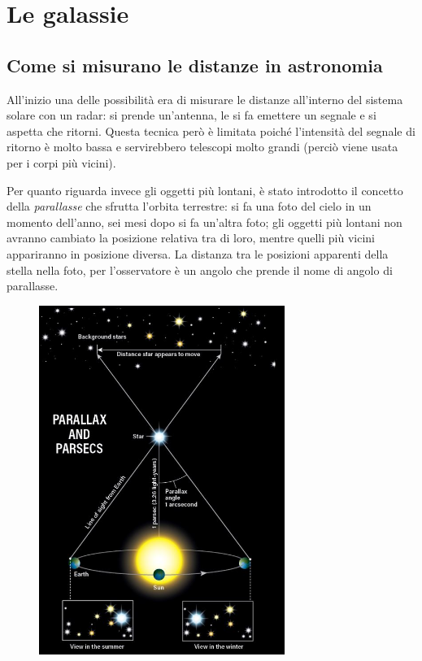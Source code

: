 \newpage

\section{Le galassie}

\subsection{Come si misurano le distanze in astronomia}
All'inizio una delle possibilità era di misurare le distanze all'interno del sistema solare con un radar: si prende un'antenna, le si fa emettere un segnale e si aspetta che ritorni. Questa tecnica però è limitata poiché l'intensità del segnale di ritorno è molto bassa e servirebbero telescopi molto grandi (perciò viene usata per i corpi più vicini).

Per quanto riguarda invece gli oggetti più lontani, è stato introdotto il concetto della \textit{parallasse} che sfrutta l'orbita terrestre: si fa una foto del cielo in un momento dell'anno, sei mesi dopo si fa un'altra foto; gli oggetti più lontani non avranno cambiato la posizione relativa tra di loro, mentre quelli più vicini appariranno in posizione diversa. La distanza tra le posizioni apparenti della stella nella foto, per l'osservatore è un angolo che prende il nome di angolo di parallasse.

\begin{figure}[H]
    \centering
    \includegraphics[width=8cm]{Parallasse.JPG}
\end{figure}


